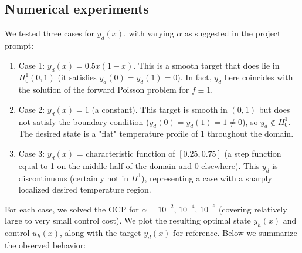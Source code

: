 \documentclass[a4paper,10pt]{article}
\begin{document}
\subsection{Numerical experiments} We tested three cases for $y_d(x)$, with varying $\alpha$ as suggested in the project prompt:

\begin{enumerate}
	\item Case 1: $y_d(x) = 0.5x(1-x)$. This is a smooth target that does lie in $H^1_0(0,1)$ (it satisfies $y_d(0)=y_d(1)=0$). In fact, $y_d$ here coincides with the solution of the forward Poisson problem for $f\equiv 1$.
	\item Case 2: $y_d(x) = 1$ (a constant). This target is smooth in $(0,1)$ but does not satisfy the boundary condition ($y_d(0)=y_d(1)=1\neq0$), so $y_d\notin H^1_0$. The desired state is a "flat" temperature profile of 1 throughout the domain.
	\item Case 3: $y_d(x)$ = characteristic function of $[0.25,0.75]$ (a step function equal to 1 on the middle half of the domain and 0 elsewhere). This $y_d$ is discontinuous (certainly not in $H^1$), representing a case with a sharply localized desired temperature region.
\end{enumerate}

For each case, we solved the OCP for $\alpha = 10^{-2},\,10^{-4},\,10^{-6}$ (covering relatively large to very small control cost). We plot the resulting optimal state $y_h(x)$ and control $u_h(x)$, along with the target $y_d(x)$ for reference. Below we summarize the observed behavior:
\end{document}
